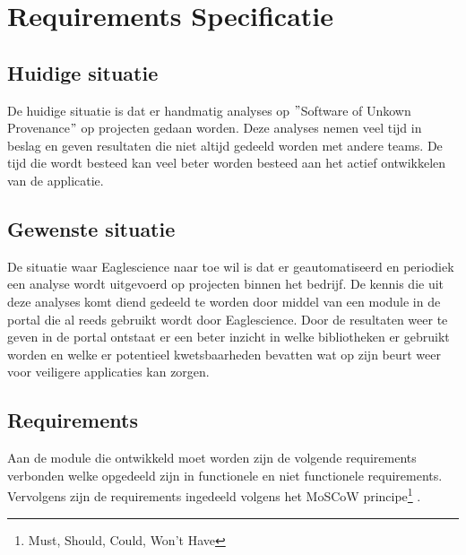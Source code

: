 
\chapter{Requirements Specificatie}\label{ch:requirements-specificatie}


\section{Huidige situatie}\label{sec:huidige-situatie}
De huidige situatie is dat er handmatig analyses op $"$Software of Unkown Provenance$"$ op projecten gedaan worden. Deze analyses nemen veel tijd in beslag en geven resultaten die niet altijd gedeeld worden met andere teams. De tijd die wordt besteed kan veel beter worden besteed aan het actief ontwikkelen van de applicatie.


\section{Gewenste situatie}\label{sec:gewenste-situatie}
De situatie waar Eaglescience naar toe wil is dat er geautomatiseerd en periodiek een analyse wordt uitgevoerd op projecten binnen het bedrijf. De kennis die uit deze analyses komt diend gedeeld te worden door middel van een module in de portal die al reeds gebruikt wordt door Eaglescience. Door de resultaten weer te geven in de portal ontstaat er een beter inzicht in welke bibliotheken er gebruikt worden en welke er potentieel kwetsbaarheden bevatten wat op zijn beurt weer voor veiligere applicaties kan zorgen.

\section{Requirements}\label{sec:requirements}
Aan de module die ontwikkeld moet worden zijn de volgende requirements verbonden welke opgedeeld zijn in functionele en niet functionele requirements. Vervolgens zijn de requirements ingedeeld volgens het MoSCoW principe\footnote{Must, Should, Could, Won't Have} .

